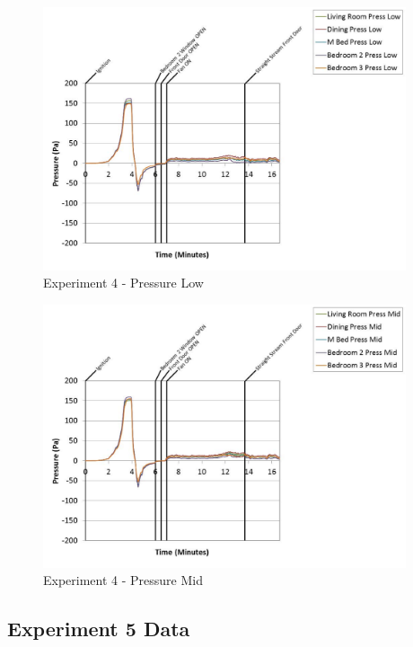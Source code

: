 \documentclass{article}
\begin{document}
\begin{appendices}
	\clearpage

	\begin{figure}[h!]
		\centering
		\includegraphics[height=3.05in]{0_Images/Results_Charts/Exp_4_Charts/PressureLow.pdf}
		\caption{Experiment 4 - Pressure Low}
	\end{figure}
 

	\begin{figure}[h!]
		\centering
		\includegraphics[height=3.05in]{0_Images/Results_Charts/Exp_4_Charts/PressureMid.pdf}
		\caption{Experiment 4 - Pressure Mid}
	\end{figure}
 
	\clearpage

		\clearpage
\clearpage		\large
\subsection{Experiment 5 Data} \label{App:Exp5Results} 


\end{appendices}
\end{document}
